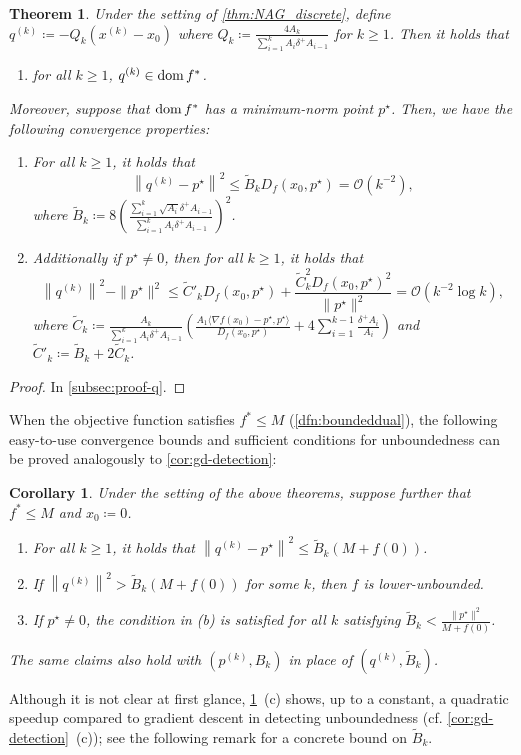 \documentclass[11pt,a4paper]{article}
\theoremstyle{definition}
\theoremstyle{plain}
\newtheorem{thm}{Theorem}[section]
\newtheorem{cor}[cor]{Corollary}
\newcommand{\dom}{\mathop{\rm dom}}
\begin{document}
\begin{thm}
    \label{thm:NAG_discrete-q}
    Under the setting of \cref{thm:NAG_discrete}, define $q^{(k)} \coloneqq -Q_k\left(x^{(k)} - x_0\right)$ where $Q_k \coloneqq \frac{4A_k}{\sum_{i = 1}^kA_i\delta^+A_{i - 1}}$ for $k \ge 1$.
    Then it holds that
    \begin{enumerate}
        \item[(a)] for all $k \ge 1$, $q^{(k)} \in \dom f^\ast$.
    \end{enumerate}
    Moreover, suppose that $\dom f^\ast$ has a minimum-norm point $p^\star$.
    Then, we have the following convergence properties:
    \begin{enumerate}
        \item[(b)] For all $k \ge 1$, it holds that 
        \[
            \left\|q^{(k)} - p^\star\right\|^2 \le \tilde B_kD_f(x_0, p^\star) = \mathcal{O}(k^{-2}),
        \]
        where $\tilde B_k \coloneqq 8\left(\frac{\sum_{i = 1}^k\sqrt{A_i}\delta^+A_{i - 1}}{\sum_{i = 1}^kA_i\delta^+A_{i - 1}}\right)^2$.
        \item[(c)] Additionally if $p^\star \neq 0$, then for all $k \ge 1$, it holds that
        \[
            \left\|q^{(k)}\right\|^2 - \|p^\star\|^2 \le \tilde C'_kD_f(x_0, p^\star) + \frac{\tilde C_k^2D_f(x_0, p^\star)^2}{\|p^\star\|^2} = \mathcal{O}(k^{-2}\log k),
        \]
        where $\tilde C_k \coloneqq \frac{A_k}{\sum_{i = 1}^kA_i\delta^+A_{i - 1}}\left(\frac{A_1\langle\nabla f(x_0) - p^\star, p^\star\rangle}{D_f(x_0, p^\star)} + 4\sum_{i = 1}^{k - 1}\frac{\delta^+A_i}{A_i}\right)$ and $\tilde C'_k \coloneqq \tilde B_k + 2\tilde C_k$.
    \end{enumerate}
\end{thm}
\begin{proof}
    In \cref{subsec:proof-q}.
\end{proof}
When the objective function satisfies $f^\ast \le M$ (\cref{dfn:boundeddual}), the following easy-to-use convergence bounds and sufficient conditions for unboundedness can be proved analogously to \cref{cor:gd-detection}:
\begin{cor}\label{cor:NAG-detection}
    Under the setting of the above theorems, suppose further that $f^\ast \le M$ and $x_0 \coloneqq 0$.
    \begin{enumerate}
        \item[(a)] For all $k \ge 1$, it holds that $\left\|q^{(k)} - p^\star\right\|^2 \le \tilde B_k(M + f(0))$.
        \item[(b)] If $\left\|q^{(k)}\right\|^2 > \tilde B_k(M + f(0))$ for some $k$, then $f$ is lower-unbounded.
        \item[(c)] If $p^\star \neq 0$, the condition in (b) is satisfied for all $k$ satisfying $\tilde B_k < \frac{\|p^\star\|^2}{M +f(0)}$.
    \end{enumerate}
    The same claims also hold with $(p^{(k)}, B_k)$ in place of $(q^{(k)}, \tilde B_k)$.
\end{cor}
Although it is not clear at first glance, \cref{cor:NAG-detection}~(c) shows, up to a constant, a quadratic speedup compared to gradient descent in detecting unboundedness (cf. \cref{cor:gd-detection}~(c)); see the following remark for a concrete bound on $\tilde B_k$.
\end{document}
